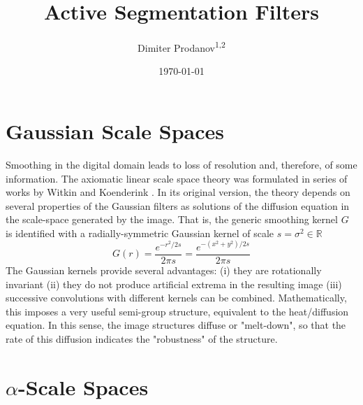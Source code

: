 \documentclass{amsart}
\title{Active Segmentation Filters}
\author{Dimiter Prodanov\textsuperscript{1,2} }
\begin{document}
\date{\today}	
\maketitle
\tableofcontents


\section{Gaussian Scale Spaces}

Smoothing in the digital domain leads to loss of resolution and, therefore, of some information.
The axiomatic linear scale space theory was formulated in series of works by Witkin and Koenderink \cite{Witkin1983, Koenderink1984}.
In its original version, the theory depends on several properties of the Gaussian filters as solutions of the diffusion equation in the scale-space generated by the image.
That is, the generic smoothing kernel $G$ is identified with a radially-symmetric Gaussian kernel of scale $s=\sigma^2 \in \mathbb{R}$
\[
G (r)= \frac{e^{-r^2/2s}}{2 \pi s } = \frac{e^{-(x^2+y^2)/2s}}{2 \pi s }
\]
The Gaussian kernels provide several advantages:  
(i) they are rotationally invariant
(ii) they do not produce artificial extrema in the resulting image
(iii) successive convolutions with different kernels can be combined.
Mathematically, this imposes a very useful semi-group structure, equivalent to the heat/diffusion equation.
In this sense, the image structures diffuse or "melt-down", so that the rate of this diffusion indicates the "robustness" of the structure.

\section{$\alpha$-Scale Spaces}\label{sec:alphascale}
\end{document}
